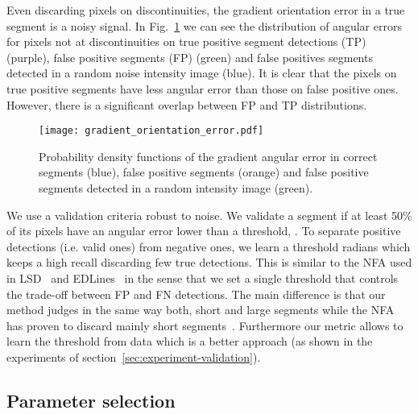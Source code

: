 \documentclass[preprint,12pt]{elsarticle}
\begin{document}
Even discarding pixels on discontinuities, the gradient orientation error in a true segment is a noisy signal. 
In Fig.~\ref{fig:gradient-orientation-validation} we can see the distribution of angular errors for pixels not at discontinuities on true positive segment detections (TP) (purple), false positive segments (FP) (green) and false positives segments detected in a random noise intensity image (blue). It is clear that the pixels on true positive segments have less angular error than those  on false positive ones. However, there is a significant overlap between FP and TP distributions. 

\begin{figure}
    \centering
    \texttt{[image: gradient\_orientation\_error.pdf]}
    \caption{Probability density functions of the gradient angular error in correct segments (blue), false positive segments (orange) and false positive segments detected in a random intensity image (green). }
    \label{fig:gradient-orientation-validation}
\end{figure}

We use a validation criteria robust to noise. We validate a segment if at least 50\% of its pixels have an angular error lower than a threshold, . To separate positive detections (i.e. valid ones) from negative ones, we learn a threshold  radians which keeps a high recall discarding few true detections.
This is similar to the NFA used in LSD~\cite{grompone2010lsd} and EDLines~\cite{akinlar2011edlines} in the sense that we set a single threshold that controls the trade-off between FP and FN detections. The main difference is that our method judges in the same way both, short and large segments while the NFA has proven to discard mainly short segments~\cite{akinlar2011edlines}. Furthermore our metric allows to learn the threshold from data which is a better approach (as shown in the experiments of section~\ref{sec:experiment-validation}).


\subsection{Parameter selection}
\end{document}
